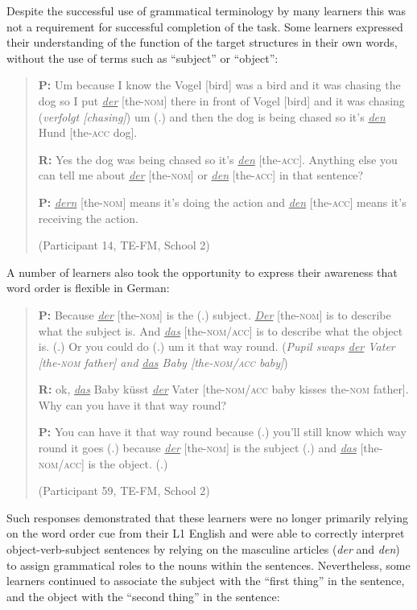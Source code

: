 \documentclass[output=paper]{langscibook}
\begin{document}
Despite the successful use of grammatical terminology by many learners this was not a requirement for successful completion of the task. Some learners expressed their understanding of the function of the target structures in their own words, without the use of terms such as ``subject'' or ``object'':

\begin{quote}
  \textbf{P:} Um because I know the Vogel [bird] was a bird and it was   chasing the dog so I put \textit{\ul{der}} [the-\textsc{nom}] there in front of Vogel   [bird] and it was chasing (\textit{verfolgt [chasing]}) um (.) and then   the dog is being chased so it’s \textit{\ul{den}} Hund [the-\textsc{acc} dog].

  \textbf{R:} Yes the dog was being chased so it’s \textit{\ul{den}} [the-\textsc{acc}].   Anything else you can tell me about \textit{\ul{der}} [the-\textsc{nom}] or \textit{\ul{den}}   [the-\textsc{acc}] in that sentence?

  \textbf{P:} \textit{\ul{dern}} [the-\textsc{nom}] means it’s doing the action and \textit{\ul{den}} [the-\textsc{acc}] means it’s receiving the action. 

(Participant 14, TE-FM, School 2)
\end{quote}

A number of learners also took the opportunity to express their awareness that word order is flexible in German:

\begin{quote}
  \textbf{P:} Because \textit{\ul{der}} [the-\textsc{nom}] is the (.) subject. \textit{\ul{Der}} [the-\textsc{nom}] is   to describe what the subject is. And \textit{\ul{das}} [the-\textsc{nom/acc}] is to   describe what the object is. (.) Or you could do (.) um it that   way round. (\textit{Pupil swaps \ul{der} Vater [the-\textsc{nom} father] and \ul{das}   Baby [the-\textsc{nom/acc} baby]})

  \textbf{R:} ok, \textit{\ul{das}} Baby küsst \textit{\ul{der}} Vater [the-\textsc{nom/acc} baby kisses   the-\textsc{nom} father]. Why can you have it that way round?

  \textbf{P:} You can have it that way round because (.) you’ll still know   which way round it goes (.) because \textit{\ul{der}} [the-\textsc{nom}] is the   subject (.) and \textit{\ul{das}} [the-\textsc{nom/acc}] is the object. (.) 

(Participant 59, TE-FM, School 2)
\end{quote}

Such responses demonstrated that these learners were no longer primarily relying on the word order cue from their L1 English and were able to correctly interpret object-verb-subject sentences by relying on the masculine articles (\textit{der} and \textit{den}) to assign grammatical roles to the nouns within the sentences. Nevertheless, some learners continued to associate the subject with the ``first thing'' in the sentence, and the object with the ``second thing'' in the sentence: 
\end{document}
